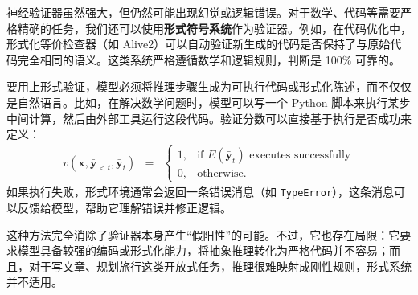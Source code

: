 神经验证器虽然强大，但仍然可能出现幻觉或逻辑错误。对于数学、代码等需要严格精确的任务，我们还可以使用\textbf{形式符号系统}作为验证器。例如，在代码优化中，形式化等价检查器（如 Alive2）可以自动验证新生成的代码是否保持了与原始代码完全相同的语义。这类系统严格遵循数学和逻辑规则，判断是 100\% 可靠的。

要用上形式验证，模型必须将推理步骤生成为可执行代码或形式化陈述，而不仅仅是自然语言。比如，在解决数学问题时，模型可以写一个 Python 脚本来执行某步中间计算，然后由外部工具运行这段代码。验证分数可以直接基于执行是否成功来定义：
\begin{eqnarray}
v(\mathbf{x}, \bar{\mathbf{y}}_{<t}, \bar{\mathbf{y}}_t) & = & \begin{cases}
1, & \text{if } E(\bar{\mathbf{y}}_t) \text{ executes successfully} \\
0, & \text{otherwise}.
\end{cases}
\end{eqnarray}
如果执行失败，形式环境通常会返回一条错误消息（如 \texttt{TypeError}），这条消息可以反馈给模型，帮助它理解错误并修正逻辑。

这种方法完全消除了验证器本身产生“假阳性”的可能。不过，它也存在局限：它要求模型具备较强的编码或形式化能力，将抽象推理转化为严格代码并不容易；而且，对于写文章、规划旅行这类开放式任务，推理很难映射成刚性规则，形式系统并不适用。






